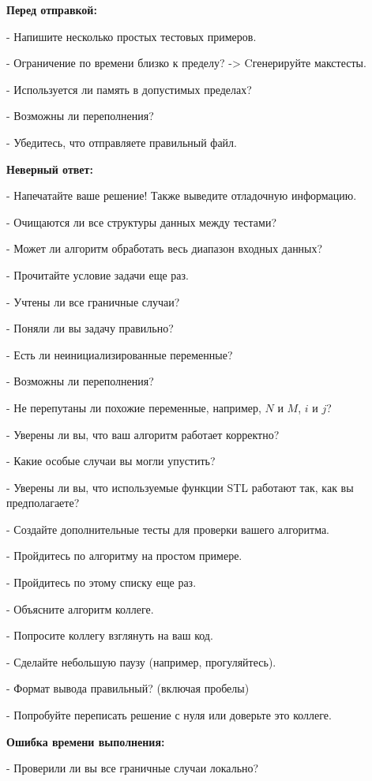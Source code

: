 
\textbf{Перед отправкой:}  

- Напишите несколько простых тестовых примеров.  

- Ограничение по времени близко к пределу? -> Cгенерируйте макстесты.  

- Используется ли память в допустимых пределах?  

- Возможны ли переполнения?  

- Убедитесь, что отправляете правильный файл.  

\textbf{Неверный ответ:}  

- Напечатайте ваше решение! Также выведите отладочную информацию.  

- Очищаются ли все структуры данных между тестами?  

- Может ли алгоритм обработать весь диапазон входных данных?  

- Прочитайте условие задачи еще раз.  

- Учтены ли все граничные случаи?  

- Поняли ли вы задачу правильно?  

- Есть ли неинициализированные переменные?  

- Возможны ли переполнения?  

- Не перепутаны ли похожие переменные, например, $N$ и $M$, $i$ и $j$?  

- Уверены ли вы, что ваш алгоритм работает корректно?  

- Какие особые случаи вы могли упустить?  

- Уверены ли вы, что используемые функции STL работают так, как вы предполагаете?  

- Создайте дополнительные тесты для проверки вашего алгоритма.  

- Пройдитесь по алгоритму на простом примере.  

- Пройдитесь по этому списку еще раз.  

- Объясните алгоритм коллеге.  

- Попросите коллегу взглянуть на ваш код.  

- Сделайте небольшую паузу (например, прогуляйтесь).  

- Формат вывода правильный? (включая пробелы)  

- Попробуйте переписать решение с нуля или доверьте это коллеге.  

\textbf{Ошибка времени выполнения:}  

- Проверили ли вы все граничные случаи локально?  

